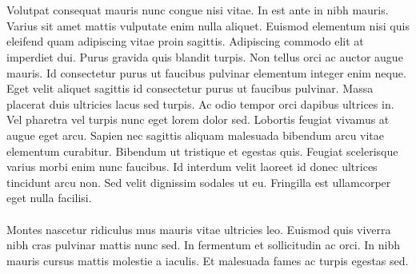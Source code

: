 \\\\
Volutpat consequat mauris nunc congue nisi vitae. In est ante in nibh mauris. Varius sit amet mattis vulputate enim nulla aliquet. Euismod elementum nisi quis eleifend quam adipiscing vitae proin sagittis. Adipiscing commodo elit at imperdiet dui. Purus gravida quis blandit turpis. Non tellus orci ac auctor augue mauris. Id consectetur purus ut faucibus pulvinar elementum integer enim neque. Eget velit aliquet sagittis id consectetur purus ut faucibus pulvinar. Massa placerat duis ultricies lacus sed turpis. Ac odio tempor orci dapibus ultrices in. Vel pharetra vel turpis nunc eget lorem dolor sed. Lobortis feugiat vivamus at augue eget arcu. Sapien nec sagittis aliquam malesuada bibendum arcu vitae elementum curabitur. Bibendum ut tristique et egestas quis. Feugiat scelerisque varius morbi enim nunc faucibus. Id interdum velit laoreet id donec ultrices tincidunt arcu non. Sed velit dignissim sodales ut eu. Fringilla est ullamcorper eget nulla facilisi.
\\\\
Montes nascetur ridiculus mus mauris vitae ultricies leo. Euismod quis viverra nibh cras pulvinar mattis nunc sed. In fermentum et sollicitudin ac orci. In nibh mauris cursus mattis molestie a iaculis. Et malesuada fames ac turpis egestas sed.